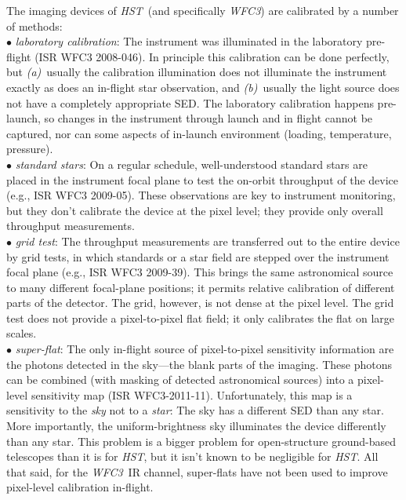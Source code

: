 \documentclass[12pt]{article}
\newcommand{\project}[1]{\textsl{#1}}
\newcommand{\HST}{\project{HST}}
\newcommand{\WFC}{\project{WFC3}}
\begin{document}
The imaging devices of \HST\ (and specifically \WFC) are calibrated by a number of
methods:
\\ $\bullet$ \project{laboratory calibration}: The instrument was illuminated
  in the laboratory pre-flight (ISR WFC3 2008-046).  In principle this calibration can be
  done perfectly, but \textsl{(a)}~usually the calibration
  illumination does not illuminate the instrument exactly as does an
  in-flight star observation, and \textsl{(b)}~usually the light
  source does not have a completely appropriate SED.  The laboratory
  calibration happens pre-launch, so changes in the instrument through
  launch and in flight cannot be captured, nor can some aspects of in-launch
  environment (loading, temperature, pressure).
\\ $\bullet$ \project{standard stars}: On a regular schedule, well-understood
  standard stars are placed in the instrument focal plane to test the
  on-orbit throughput of the device (e.g., ISR WFC3 2009-05).  These
  observations are key to instrument monitoring, but they don't
  calibrate the device at the pixel level; they provide only overall
  throughput measurements.
\\ $\bullet$ \project{grid test}: The throughput measurements are transferred
  out to the entire device by grid tests, in which standards or a star
  field are stepped over the instrument focal plane (e.g., ISR WFC3
  2009-39).  This brings the same astronomical source to many
  different focal-plane positions; it permits relative calibration of
  different parts of the detector. The grid, however, is not dense at
  the pixel level.  The grid test does not provide a pixel-to-pixel
  flat field; it only calibrates the flat on large scales.
\\ $\bullet$ \project{super-flat}: The only in-flight source of
  pixel-to-pixel sensitivity information are the photons detected in
  the sky---the blank parts of the imaging.  These photons can be
  combined (with masking of detected astronomical sources) into a
  pixel-level sensitivity map (ISR WFC3-2011-11).  Unfortunately, this
  map is a sensitivity to the \emph{sky} not to a \emph{star}: The sky
  has a different SED than any star.  More importantly, the
  uniform-brightness sky illuminates the device differently than any
  star.  This problem is a bigger problem for open-structure
  ground-based telescopes than it is for \HST, but it isn't known to
  be negligible for \HST.  All that said, for the \WFC\ IR channel,
  super-flats have not been used to improve pixel-level calibration
  in-flight.
\end{document}
